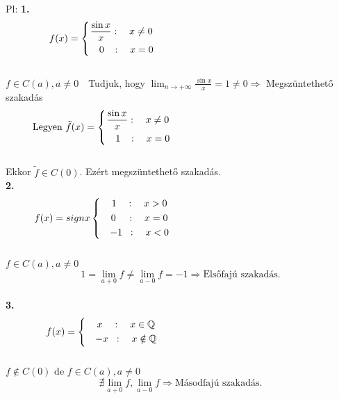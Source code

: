 \documentclass[a4paper,11pt]{article}
\begin{document}
\newpage
Pl: \textbf{1.} \[\displaystyle f(x) = 
\left\{
\begin{gathered}
\frac{\sin x}{x}: \quad x\neq 0\hspace{5.7cm} \\
\quad0\hspace{0.3cm}:\quad x=0\hspace{5.7cm}
\end{gathered}\right. \]\\[0.2cm]
$f\in C(a),a\neq 0\quad$Tudjuk, hogy $\displaystyle\lim_{n\to +\infty} \frac{\sin x}{x} =1\neq 0\Rightarrow$ Megszüntethető szakadás\\[0.1cm]
\[\text{Legyen }\displaystyle\tilde f(x) = 
\left\{
\begin{gathered}
\frac{\sin x}{x}: \quad x\neq 0\hspace{5.7cm} \\
\quad1\hspace{0.3cm}:\quad x=0\hspace{5.7cm}
\end{gathered}\right. \]\\[0.1cm]Ekkor $\tilde f\in C(0)$. Ezért megszüntethető szakadás.\\[0.4cm] \textbf{2.}\[\displaystyle f(x) = sign x
\left\{
\begin{gathered}
\quad1\quad: \quad x > 0\hspace{5.7cm} \\
\quad0\hspace{0.4cm}:\quad x=0\hspace{5.7cm} \\
\quad -1\hspace{0.2cm}:\quad x<0\hspace{5.7cm}
\end{gathered}\right. \]\\[0.2cm]
$f\in C(a), a\neq 0$
\[1=\lim_{a+0} f \neq \lim_{a-0} f = -1 \Rightarrow\text{Elsőfajú szakadás.}\]\\[0.4cm] \textbf{3.}
\[\displaystyle f(x) = 
\left\{
\begin{gathered}
\quad x\quad: \quad x\in \Q\hspace{5.7cm} \\
\quad -x\hspace{0.2cm}:\quad x\notin\Q\hspace{5.7cm}
\end{gathered}\right. \]\\[0.2cm]
$f\notin C(0)\text{ de }f\in C(a), a\neq 0$
\[\nexists\lim_{a+0} f , \lim_{a-0} f\Rightarrow\text{Másodfajú szakadás.} \]\\
\end{document}
